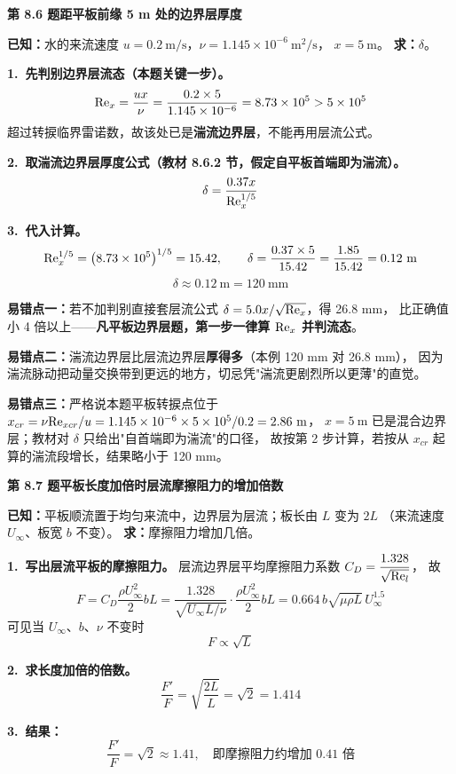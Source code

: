 \noindent\textbf{第 8.6 题\quad 距平板前缘 5 m 处的边界层厚度}

\begin{jie}
\textbf{已知：}水的来流速度 $u=0.2\ \mathrm{m/s}$，$\nu=1.145\times10^{-6}\ \mathrm{m^2/s}$，
$x=5\ \mathrm{m}$。
\textbf{求：}$\delta$。

\textbf{1.\ 先判别边界层流态（本题关键一步）。}
\[
\mathrm{Re}_x=\frac{ux}{\nu}=\frac{0.2\times5}{1.145\times10^{-6}}=8.73\times10^5>5\times10^5
\]
超过转捩临界雷诺数，故该处已是\textbf{湍流边界层}，不能再用层流公式。

\textbf{2.\ 取湍流边界层厚度公式（教材 8.6.2 节，假定自平板首端即为湍流）。}
\[
\delta=\frac{0.37x}{\mathrm{Re}_x^{1/5}}
\]

\textbf{3.\ 代入计算。}
\[
\Rey_x^{1/5}=\left(8.73\times10^5\right)^{1/5}=15.42,
\qquad
\delta=\frac{0.37\times5}{15.42}=\frac{1.85}{15.42}=0.12\ \mathrm{m}
\]
\[
\boxed{\,\delta\approx0.12\ \mathrm{m}=120\ \mathrm{mm}\,}
\]
\end{jie}

\begin{yicuo}
\textbf{易错点一：}若不加判别直接套层流公式 $\delta=5.0x/\sqrt{\mathrm{Re}_x}$，得 26.8 mm，
比正确值小 4 倍以上——\textbf{凡平板边界层题，第一步一律算 $\mathrm{Re}_x$ 并判流态}。

\textbf{易错点二：}湍流边界层比层流边界层\textbf{厚得多}（本例 120 mm 对 26.8 mm），
因为湍流脉动把动量交换带到更远的地方，切忌凭"湍流更剧烈所以更薄"的直觉。

\textbf{易错点三：}严格说本题平板转捩点位于
$x_{cr}=\nu\Rey_{xcr}/u=1.145\times10^{-6}\times5\times10^5/0.2=2.86\ \mathrm{m}$，
$x=5\ \mathrm{m}$ 已是混合边界层；教材对 $\delta$ 只给出"自首端即为湍流"的口径，
故按第 2 步计算，若按从 $x_{cr}$ 起算的湍流段增长，结果略小于 120 mm。
\end{yicuo}

\noindent\textbf{第 8.7 题\quad 平板长度加倍时层流摩擦阻力的增加倍数}

\begin{jie}
\textbf{已知：}平板顺流置于均匀来流中，边界层为层流；板长由 $L$ 变为 $2L$
（来流速度 $U_\infty$、板宽 $b$ 不变）。
\textbf{求：}摩擦阻力增加几倍。

\textbf{1.\ 写出层流平板的摩擦阻力。}
层流边界层平均摩擦阻力系数 $C_D=\dfrac{1.328}{\sqrt{\mathrm{Re}_l}}$，
故
\[
F=C_D\frac{\rho U_\infty^2}{2}bL
=\frac{1.328}{\sqrt{U_\infty L/\nu}}\cdot\frac{\rho U_\infty^2}{2}bL
=0.664\,b\sqrt{\mu\rho L}\,U_\infty^{1.5}
\]
可见当 $U_\infty$、$b$、$\nu$ 不变时
\[
F\propto\sqrt{L}
\]

\textbf{2.\ 求长度加倍的倍数。}
\[
\frac{F'}{F}=\sqrt{\frac{2L}{L}}=\sqrt{2}=1.414
\]

\textbf{3.\ 结果：}
\[
\boxed{\,\frac{F'}{F}=\sqrt{2}\approx1.41,\quad\text{即摩擦阻力约增加 }0.41\text{ 倍}\,}
\]
\end{jie}

